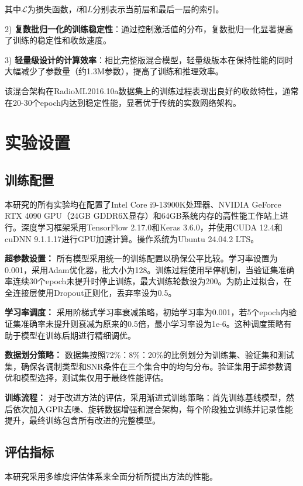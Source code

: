 \documentclass[conference]{IEEEtran}
\begin{document}
其中$\mathcal{L}$为损失函数，$l$和$L$分别表示当前层和最后一层的索引。

2) \textbf{复数批归一化的训练稳定性}：通过控制激活值的分布，复数批归一化显著提高了训练的稳定性和收敛速度。

3) \textbf{轻量级设计的计算效率}：相比完整版混合模型，轻量级版本在保持性能的同时大幅减少了参数量（约1.3M参数），提高了训练和推理效率。

该混合架构在RadioML2016.10a数据集上的训练过程表现出良好的收敛特性，通常在20-30个epoch内达到稳定性能，显著优于传统的实数网络架构。

\section{实验设置}

\subsection{训练配置}

本研究的所有实验均在配置了Intel Core i9-13900K处理器、NVIDIA GeForce RTX 4090 GPU（24GB GDDR6X显存）和64GB系统内存的高性能工作站上进行。深度学习框架采用TensorFlow 2.17.0和Keras 3.6.0，并使用CUDA 12.4和cuDNN 9.1.1.17进行GPU加速计算。操作系统为Ubuntu 24.04.2 LTS。

\textbf{超参数设置：}
所有模型采用统一的训练配置以确保公平比较。学习率设置为0.001，采用Adam优化器，批大小为128。训练过程使用早停机制，当验证集准确率连续30个epoch未提升时停止训练，最大训练轮数设为200。为防止过拟合，在全连接层使用Dropout正则化，丢弃率设为0.5。

\textbf{学习率调度：}
采用阶梯式学习率衰减策略，初始学习率为0.001，若5个epoch内验证集准确率未提升则衰减为原来的0.5倍，最小学习率设为1e-6。这种调度策略有助于模型在训练后期进行精细调优。

\textbf{数据划分策略：}
数据集按照72\%：8\%：20\%的比例划分为训练集、验证集和测试集，确保各调制类型和SNR条件在三个集合中的均匀分布。验证集用于超参数调优和模型选择，测试集仅用于最终性能评估。

\textbf{训练流程：}
对于改进方法的评估，采用渐进式训练策略：首先训练基线模型，然后依次加入GPR去噪、旋转数据增强和混合架构，每个阶段独立训练并记录性能提升，最终训练包含所有改进的完整模型。

\subsection{评估指标}

本研究采用多维度评估体系来全面分析所提出方法的性能。
\end{document}
